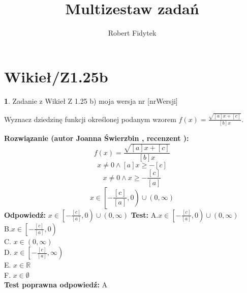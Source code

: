 \documentclass[12pt, a4paper]{article}
\title{Multizestaw zadań}
\author{Robert Fidytek}
\date{}
\theoremstyle{definition} %
\newtheorem{zad}{}
\newcommand{\kategoria}[1]{\section{#1}} %
\newcommand{\zadStart}[1]{\begin{zad}#1\newline} %
\newcommand{\zadStop}{\end{zad}}   %
\newcommand{\rozwStart}[2]{\noindent \textbf{Rozwiązanie (autor #1 , recenzent #2): }\newline} %
\newcommand{\rozwStop}{\newline}                                            %
\newcommand{\odpStart}{\noindent \textbf{Odpowiedź:}\newline}    %
\newcommand{\odpStop}{\newline}                                             %
\newcommand{\testStart}{\noindent \textbf{Test:}\newline} %
\newcommand{\testStop}{\newline} %
\newcommand{\kluczStart}{\noindent \textbf{Test poprawna odpowiedź:}\newline} %
\newcommand{\kluczStop}{\newline} %
\begin{document}
\maketitle


\kategoria{Wikieł/Z1.25b}
\zadStart{Zadanie z Wikieł Z 1.25 b) moja wersja nr [nrWersji]}


Wyznacz dziedzinę funkcji określonej podanym wzorem  $f(x)=\frac{\sqrt{[a]x+[c]}}{[b]x}$.
\zadStop
\rozwStart{Joanna Świerzbin}{}
$$f(x)=\frac{\sqrt{[a]x+[c]}}{[b]x}$$
$$x \neq 0 \land [a]x \geq -[c] $$
$$x \neq 0 \land x \geq -\frac{[c]}{[a]} $$
$$x \in \left[ -\frac{[c]}{[a]} , 0 \right) \cup \left(0,\infty \right) $$
\rozwStop
\odpStart
$x \in \left[ -\frac{[c]}{[a]} , 0 \right) \cup \left(0,\infty \right) $
\odpStop
\testStart
A.$x \in \left[ -\frac{[c]}{[a]} , 0 \right) \cup \left(0,\infty \right) $\\
B.$x \in \left[ -\frac{[c]}{[a]} , 0 \right) $\\
C. $x \in  \left(0,\infty \right) $\\
D. $x \in \left[ -\frac{[c]}{[a]} ,\infty \right) $\\
E. $x \in \mathbb{R}$\\
F. $x \in \emptyset $\\
\testStop
\kluczStart
A
\kluczStop
\end{document}
